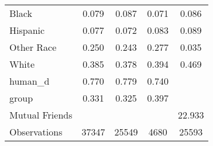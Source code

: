 {\begin{tabular}{l*{4}{c}}
\hspace{3mm} Black  &       0.079&       0.087&       0.071&       0.086\\
\hspace{3mm} Hispanic&       0.077&       0.072&       0.083&       0.089\\
\hspace{3mm} Other Race&       0.250&       0.243&       0.277&       0.035\\
\hspace{3mm} White  &       0.385&       0.378&       0.394&       0.469\\
human\_d             &       0.770&       0.779&       0.740&            \\
group               &       0.331&       0.325&       0.397&            \\
Mutual Friends      &            &            &            &      22.933\\
\midrule
Observations        &       37347&       25549&        4680&       25593\\
\bottomrule
\end{tabular}
}

